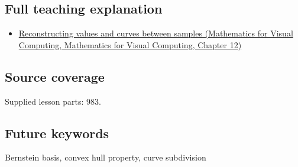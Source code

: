 \subsection{Full teaching explanation}\label{appendix-ddbec701898c-full-teaching-explanation}

\begin{itemize}
\tightlist
\item
  \href{../02-Mathematics-for-Visual-Computing/main.pdf\#nameddest=02-foundations-ii-ch028-reconstructing-values-and-curves-between-samples}{Reconstructing values and curves between samples (Mathematics for Visual Computing, Mathematics for Visual Computing, Chapter 12)}
\end{itemize}

\subsection{Source coverage}\label{appendix-ddbec701898c-source-coverage}

Supplied lesson parts: 983.

\subsection{Future keywords}\label{appendix-ddbec701898c-future-keywords}

Bernstein basis, convex hull property, curve subdivision

